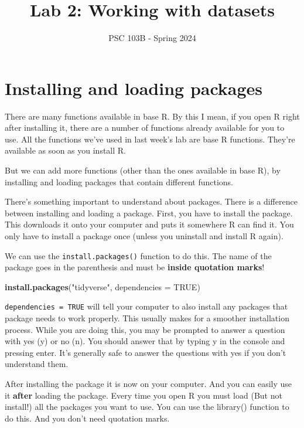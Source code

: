 \documentclass[
]{article}
\title{Lab 2: Working with datasets}
\subtitle{PSC 103B - Spring 2024}
\author{}
\date{\vspace{-2.5em}}
\newenvironment{Shaded}{\begin{snugshade}}{\end{snugshade}}
\newcommand{\AttributeTok}[1]{\textcolor[rgb]{0.13,0.29,0.53}{#1}}
\newcommand{\ConstantTok}[1]{\textcolor[rgb]{0.56,0.35,0.01}{#1}}
\newcommand{\FunctionTok}[1]{\textcolor[rgb]{0.13,0.29,0.53}{\textbf{#1}}}
\newcommand{\NormalTok}[1]{#1}
\newcommand{\StringTok}[1]{\textcolor[rgb]{0.31,0.60,0.02}{#1}}
\begin{document}
\maketitle

\hypertarget{installing-and-loading-packages}{%
\section{Installing and loading
packages}\label{installing-and-loading-packages}}

There are many functions available in base R. By this I mean, if you
open R right after installing it, there are a number of functions
already available for you to use. All the functions we've used in last
week's lab are base R functions. They're available as soon as you
install R.

But we can add more functions (other than the ones available in base R),
by installing and loading packages that contain different functions.

There's something important to understand about packages. There is a
difference between installing and loading a package. First, you have to
install the package. This downloads it onto your computer and puts it
somewhere R can find it. You only have to install a package once (unless
you uninstall and install R again).

We can use the \texttt{install.packages()} function to do this. The name
of the package goes in the parenthesis and must be \textbf{inside
quotation marks}!

\begin{Shaded}
\begin{Highlighting}[]
\FunctionTok{install.packages}\NormalTok{(}\StringTok{"tidyverse"}\NormalTok{, }\AttributeTok{dependencies =} \ConstantTok{TRUE}\NormalTok{)}
\end{Highlighting}
\end{Shaded}

\texttt{dependencies\ =\ TRUE} will tell your computer to also install
any packages that package needs to work properly. This usually makes for
a smoother installation process. While you are doing this, you may be
prompted to answer a question with yes (y) or no (n). You should answer
that by typing y in the console and pressing enter. It's generally safe
to answer the questions with yes if you don't understand them.

After installing the package it is now on your computer. And you can
easily use it \textbf{after} loading the package. Every time you open R
you must load (But not install!) all the packages you want to use. You
can use the library() function to do this. And you don't need quotation
marks.
\end{document}

